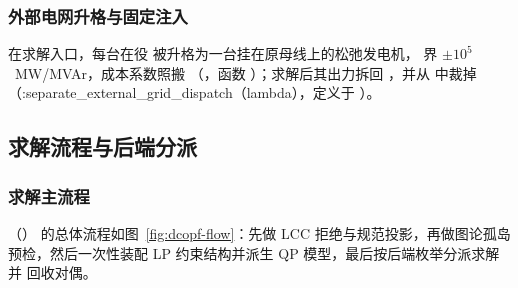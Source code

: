 \subsubsection*{外部电网升格与固定注入}
在求解入口，每台在役  被升格为一台挂在原母线上的松弛发电机，
界 $\pm 10^{5}$~MW/MVAr，成本系数照搬 
（，函数
）；求解后其出力拆回
，并从  中裁掉（:separate\_external\_grid\_dispatch（lambda），定义于
）。

\subsection{求解流程与后端分派}\label{subsec:dcopf-solve}

\subsubsection*{求解主流程}
（）
的总体流程如图~\ref{fig:dcopf-flow}：先做 LCC 拒绝与规范投影，再做图论孤岛
预检，然后一次性装配 LP 约束结构并派生 QP 模型，最后按后端枚举分派求解并
回收对偶。

